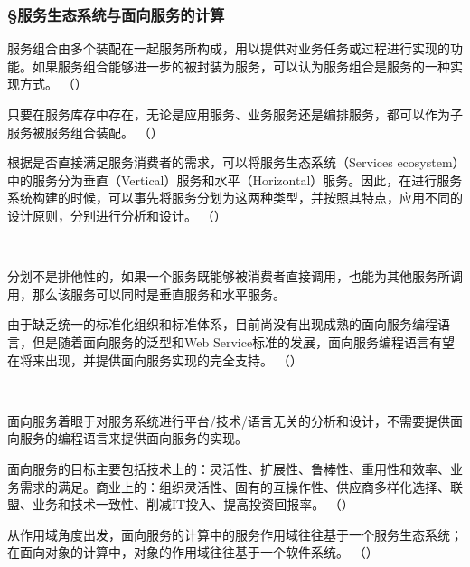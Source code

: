 \subsubsection*{\S 服务生态系统与面向服务的计算}
\setcounter{problemname}{0}

\begin{problem}
	服务组合由多个装配在一起服务所构成，用以提供对业务任务或过程进行实现的功能。如果服务组合能够进一步的被封装为服务，可以认为服务组合是服务的一种实现方式。
	\hfill （）
\end{problem}


\begin{problem}
	只要在服务库存中存在，无论是应用服务、业务服务还是编排服务，都可以作为子服务被服务组合装配。
	\hfill （）
\end{problem}


\begin{problem}
	根据是否直接满足服务消费者的需求，可以将服务生态系统（Services ecosystem）中的服务分为垂直（Vertical）服务和水平（Horizontal）服务。因此，在进行服务系统构建的时候，可以事先将服务分划为这两种类型，并按照其特点，应用不同的设计原则，分别进行分析和设计。
	\hfill （）
\end{problem}
\\ \begin{solution}
	分划不是排他性的，如果一个服务既能够被消费者直接调用，也能为其他服务所调用，那么该服务可以同时是垂直服务和水平服务。
\end{solution}


\begin{problem}
	由于缺乏统一的标准化组织和标准体系，目前尚没有出现成熟的面向服务编程语言，但是随着面向服务的泛型和Web Service标准的发展，面向服务编程语言有望在将来出现，并提供面向服务实现的完全支持。
	\hfill （）
\end{problem}
\\ \begin{solution}
	面向服务着眼于对服务系统进行平台/技术/语言无关的分析和设计，不需要提供面向服务的编程语言来提供面向服务的实现。
\end{solution}


\begin{problem}
	面向服务的目标主要包括技术上的：灵活性、扩展性、鲁棒性、重用性和效率、业务需求的满足。商业上的：组织灵活性、固有的互操作性、供应商多样化选择、联盟、业务和技术一致性、削减IT投入、提高投资回报率。
	\hfill （）
\end{problem}


\begin{problem}
	从作用域角度出发，面向服务的计算中的服务作用域往往基于一个服务生态系统；在面向对象的计算中，对象的作用域往往基于一个软件系统。
	\hfill （）
\end{problem}


